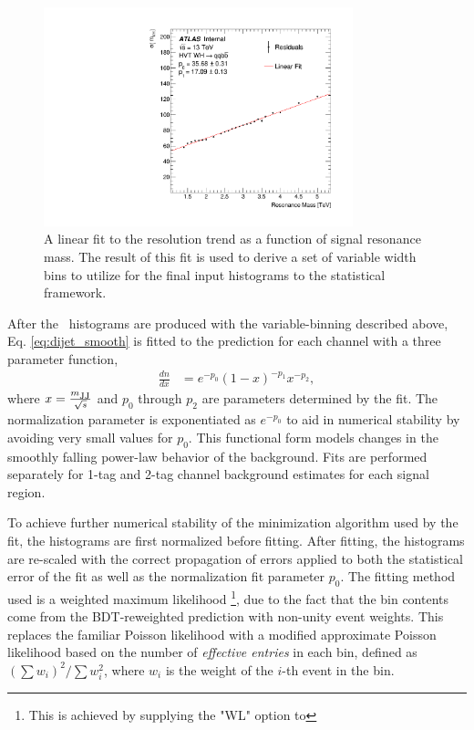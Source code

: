 \begin{figure}[htbp!]
\begin{center}
    \includegraphics[width=0.8\textwidth]{VHqqbb_WH_ResoTrendCrystalBall.pdf}
\end{center}
\caption{A linear fit to the \mvh resolution trend as a function of signal resonance mass.
The result of this fit is used to derive a set of variable width bins to utilize for the final input histograms to the statistical framework.}
\label{fig:mvh_reso_trend}
\end{figure}

After the \mvh\ histograms are produced with the variable-binning described above, Eq. \ref{eq:dijet_smooth} is fitted to the prediction for each channel with a three parameter function,
\begin{align}
    \frac{dn}{dx} &= e^{-p_0} \left(1 - x\right)^{-p_1} x^{-p_2},
    \label{eq:dijet_smooth}
\end{align}
where $x = \frac{m\textsubscript{JJ}}{\sqrt{s}}$ and $p_0$ through $p_2$ are parameters determined by the fit.
The normalization parameter is exponentiated as $e^{-p_0}$ to aid in numerical stability by avoiding very small values for $p_0$.
This functional form models changes in the smoothly falling power-law behavior of the background.
Fits are performed separately for 1-tag and 2-tag channel background estimates for each signal region.

To achieve further numerical stability of the minimization algorithm used by the fit, the histograms are first normalized before fitting.
After fitting, the histograms are re-scaled with the correct propagation of errors applied to both the statistical error of the fit as well as the normalization fit parameter $p_0$.
The fitting method used is a weighted maximum likelihood \footnote{This is achieved by supplying the "WL" option to }, due to the fact that the bin contents come from the BDT-reweighted prediction with non-unity event weights.
This replaces the familiar Poisson likelihood with a modified approximate Poisson likelihood based on the number of \textit{effective entries} in each bin, defined as $\left(\sum w_i \right)^2 / \sum w_i^2$, where $w_i$ is the weight of the $i$-th event in the bin.

